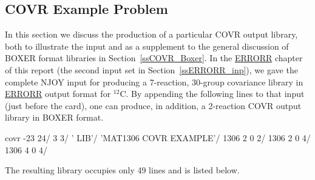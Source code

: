 \subsection{COVR Example Problem}
\label{ssCOVR_example1}

In this section we discuss the production of a particular COVR output
library, both to illustrate the input and as a supplement to the
general discussion of BOXER format libraries in  Section~\ref{ssCOVR_Boxer}.
In the \hyperlink{sERRORRhy}{ERRORR} chapter of this report
(the second input set in Section~\ref{ssERRORR_inp}),
we gave the complete NJOY input for producing a 7-reaction,
30-group covariance library in \hyperlink{sERRORRhy}{ERRORR}
output format for $^{12}$C.  By appending the following lines to
that input (just before the  card), one can produce,
in addition, a 2-reaction COVR output library in BOXER format.

\small
\begin{ccode}

     covr
     -23 24/
     3 3/
     '  LIB'/
     'MAT1306 COVR EXAMPLE'/
     1306 2 0 2/
     1306 2 0 4/
     1306 4 0 4/

\end{ccode}
\normalsize

\noindent
The resulting library occupies only 49 lines and is listed below.

